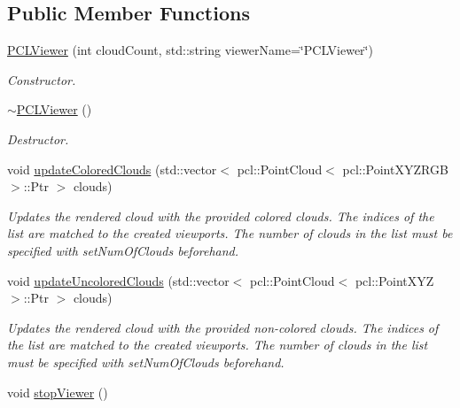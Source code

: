 \subsection*{Public Member Functions}
\begin{DoxyCompactItemize}
\item 
\hyperlink{class_p_c_l_viewer_a1e39d582dfc8f0ef9b4a4a6624010ff5}{P\+C\+L\+Viewer} (int cloud\+Count, std\+::string viewer\+Name=\char`\"{}P\+C\+L\+Viewer\char`\"{})
\begin{DoxyCompactList}\small\item\em Constructor. \end{DoxyCompactList}\item 
\hypertarget{class_p_c_l_viewer_a82828db52c5df5e5341adb61b77a68eb}{}\hyperlink{class_p_c_l_viewer_a82828db52c5df5e5341adb61b77a68eb}{$\sim$\+P\+C\+L\+Viewer} ()\label{class_p_c_l_viewer_a82828db52c5df5e5341adb61b77a68eb}

\begin{DoxyCompactList}\small\item\em Destructor. \end{DoxyCompactList}\item 
void \hyperlink{class_p_c_l_viewer_a1d53112e3f0fef3bfa7859f7701c9f3c}{update\+Colored\+Clouds} (std\+::vector$<$ pcl\+::\+Point\+Cloud$<$ pcl\+::\+Point\+X\+Y\+Z\+R\+G\+B $>$\+::Ptr $>$ clouds)
\begin{DoxyCompactList}\small\item\em Updates the rendered cloud with the provided colored clouds. The indices of the list are matched to the created viewports. The number of clouds in the list must be specified with set\+Num\+Of\+Clouds beforehand. \end{DoxyCompactList}\item 
void \hyperlink{class_p_c_l_viewer_a71fb70c1a38b0e39a4e3ea8fca7f8d48}{update\+Uncolored\+Clouds} (std\+::vector$<$ pcl\+::\+Point\+Cloud$<$ pcl\+::\+Point\+X\+Y\+Z $>$\+::Ptr $>$ clouds)
\begin{DoxyCompactList}\small\item\em Updates the rendered cloud with the provided non-\/colored clouds. The indices of the list are matched to the created viewports. The number of clouds in the list must be specified with set\+Num\+Of\+Clouds beforehand. \end{DoxyCompactList}\item 
\hypertarget{class_p_c_l_viewer_a0e09000bf3278e39ab1bcd1ca22c8eb5}{}void \hyperlink{class_p_c_l_viewer_a0e09000bf3278e39ab1bcd1ca22c8eb5}{stop\+Viewer} ()\label{class_p_c_l_viewer_a0e09000bf3278e39ab1bcd1ca22c8eb5}


\end{DoxyCompactItemize}
